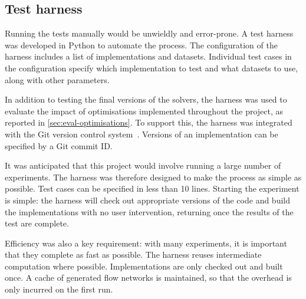 \subsection{Test harness} \label{sec:impl-benchmark-harness}

Running the tests manually would be unwieldly and error-prone. A test harness was developed in Python to automate the process. The configuration of the harness includes a list of implementations and datasets. Individual test cases in the configuration specify which implementation to test and what datasets to use, along with other parameters.

In addition to testing the final versions of the solvers, the harness was used to evaluate the impact of optimisations implemented throughout the project, as reported in \cref{sec:eval-optimisations}. To support this, the harness was integrated with the Git version control system~\cite{GitWWW}. Versions of an implementation can be specified by a Git commit ID.

It was anticipated that this project would involve running a large number of experiments. The harness was therefore designed to make the process as simple as possible. Test cases can be specified in less than 10 lines. Starting the experiment is simple: the harness will check out appropriate versions of the code and build the implementations with no user intervention, returning once the results of the test are complete.

Efficiency was also a key requirement: with many experiments, it is important that they complete as fast as possible. The harness reuses intermediate computation where possible. Implementations are only checked out and built once. A cache of generated flow networks is maintained\footnotemark, so that the overhead is only incurred on the first run.

